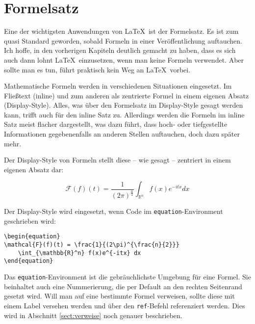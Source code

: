 
\chapter{Formelsatz}\label{chap:formel}

Eine der wichtigsten Anwendungen von \LaTeX\ ist der Formelsatz. Es ist zum quasi Standard geworden, sobald Formeln in einer Veröffentlichung auftauchen. Ich hoffe, in den vorherigen Kapiteln deutlich gemacht zu haben, dass es sich auch dann lohnt \LaTeX\ einzusetzen, wenn man keine Formeln verwendet. Aber sollte man es tun, führt praktisch kein Weg an \LaTeX\ vorbei.

Mathematische Formeln werden in verschiedenen Situationen eingesetzt. Im Fließtext (inline) und zum anderen als zentrierte Formel in einem eigenen Absatz (Display-Style). Alles, was über den Formelsatz im Display-Style gesagt werden kann, trifft auch für den inline Satz zu. Allerdings werden die Formeln im inline Satz meist flacher dargestellt, was dazu führt, dass hoch- oder tiefgestellte Informationen gegebenenfalls an anderen Stellen auftauchen, doch dazu später mehr.

Der Display-Style von Formeln stellt diese -- wie gesagt -- zentriert in einem eigenen Absatz dar:

\begin{equation}
\mathcal{F}(f)(t) = \frac{1}{(2\pi)^{\frac{n}{2}}} 
	\int_{\mathbb{R}^n} f(x)e^{-itx} dx
\end{equation}

Der Display-Style wird eingesetzt, wenn Code im \texttt{equation}-Environment geschrieben wird:
\begin{verbatim}
\begin{equation}
\mathcal{F}(f)(t) = \frac{1}{(2\pi)^{\frac{n}{2}}} 
	\int_{\mathbb{R}^n} f(x)e^{-itx} dx
\end{equation}
\end{verbatim}
Das \texttt{equation}-Environment ist die gebräuchlichste Umgebung für eine Formel. Sie beinhaltet auch eine Nummerierung, die per Default an den rechten Seitenrand gesetzt wird. Will man auf eine bestimmte Formel verweisen, sollte diese mit einem Label versehen werden und über den \texttt{ref}-Befehl referenziert werden. Dies wird in Abschnitt \ref{sect:verweise} noch genauer beschrieben.

